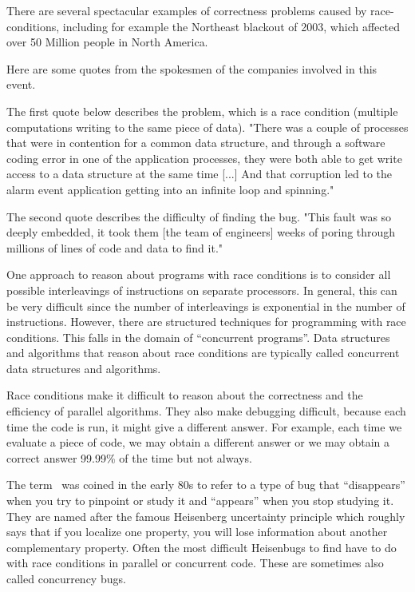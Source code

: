\begin{example}
There are several spectacular examples of correctness problems caused
by race-conditions, including for example the Northeast blackout of
2003, which affected over 50 Million people in North America.

Here are some quotes from the spokesmen of the companies involved in
this event.
%

The first quote below describes the problem, which is a race
condition (multiple computations writing to the same piece of data).
%
"There was a couple of processes that were in contention for a common
data structure, and through a software coding error in one of the
application processes, they were both able to get write access to a
data structure at the same time [...] And that corruption led to the
alarm event application getting into an infinite loop and spinning."
%

The second  quote describes the difficulty of finding the bug.
%
"This fault was so deeply embedded, it took them [the team of
  engineers] weeks of poring through millions of lines of code and
data to find it."
\end{example}

\begin{gram}
One approach to reason about programs with race conditions is to
consider all possible interleavings of instructions on separate
processors.  In general, this can be very difficult since the number
of interleavings is exponential in the number of instructions.
However, there are structured techniques for programming with race
conditions.  This falls in the domain of ``concurrent programs''.
Data structures and algorithms that reason about race conditions are
typically called concurrent data structures and algorithms.
\end{gram}

\begin{remark}[Heisenbug]
Race conditions make it difficult to reason about the correctness and
the efficiency of parallel algorithms.  They also make debugging
difficult, because each time the code is run, it might give a
different answer.
%
For example, each time we evaluate a piece of code, we may obtain a
different answer or we may obtain a correct answer 99.99\% of the time
but not always.
%

The term~ was coined in the early 80s to refer to a
type of bug that ``disappears'' when you try to pinpoint or study it
and ``appears'' when you stop studying it.  They are named after the
famous Heisenberg uncertainty principle which roughly says that if you
localize one property, you will lose information about another
complementary property.  Often the most difficult Heisenbugs to find
have to do with race conditions in parallel or concurrent code.  These
are sometimes also called concurrency bugs.
\end{remark}

